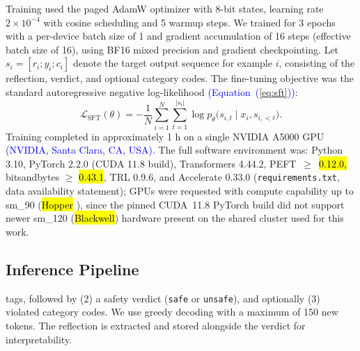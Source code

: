 \documentclass[superintelligence,article,accept,moreauthors]{Definitions/mdpi}
\newcommand{\authchg}[1]{\textcolor{blue}{#1}}
\begin{document}
Training used the paged AdamW optimizer with 8-bit states, learning rate $2 \times 10^{-4}$ with cosine scheduling and 5 warmup steps. We trained for 3 epochs with a per-device batch size of 1 and gradient accumulation of 16 steps (effective batch size of 16), using BF16 mixed precision and gradient checkpointing. Let $s_i = [r_i; y_i; c_i]$ denote the target output sequence for example $i$, consisting of the reflection, verdict, and optional category codes. The fine-tuning objective was the standard autoregressive negative log-likelihood \authchg{(Equation~(\ref{eq:sft}))}:
\begin{equation}
  \mathcal{L}_{\text{SFT}}(\theta) = - \frac{1}{N} \sum_{i=1}^{N} \sum_{t=1}^{|s_i|}
  \log p_{\theta}\bigl(s_{i,t} \mid x_i, s_{i,<t}\bigr).\label{eq:sft}
\end{equation}
Training completed in approximately 1 h on a single NVIDIA A5000 GPU \authchg{(NVIDIA, Santa Clara, CA, USA)}. The full software environment was: Python 3.10, PyTorch 2.2.0 (CUDA 11.8 build), Transformers 4.44.2, \mbox{PEFT $\geq$\hl{ 0.12.0,} %
} bitsandbytes $\geq$ \hl{0.43.1}, TRL 0.9.6, and Accelerate 0.33.0 (\texttt{requirements.txt}, data availability statement); GPUs were requested with compute capability up to sm\_90 (\hl{Hopper}%
), since the pinned CUDA~11.8 PyTorch build did not support newer sm\_120 (\hl{Blackwell}) hardware present on the shared cluster used for this work.

\subsection{Inference Pipeline}

 tags, followed by (2) a safety verdict (\texttt{safe} or \texttt{unsafe}), and optionally (3) violated category codes. We use greedy decoding with a maximum of 150 new tokens. The reflection is extracted and stored alongside the verdict for interpretability.
\end{document}
